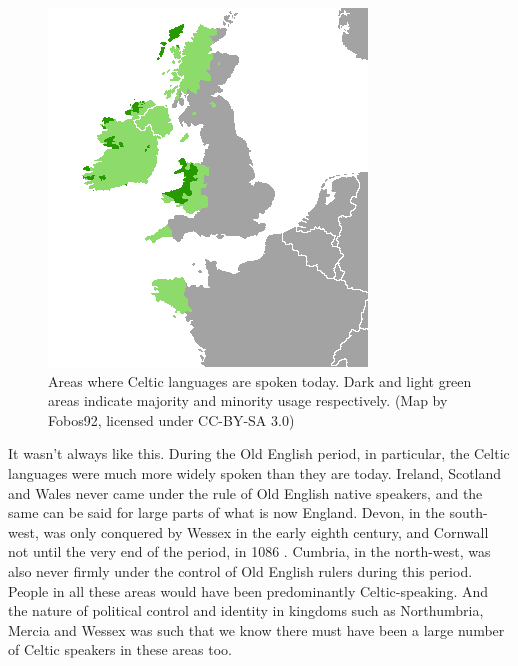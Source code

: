 \begin{figure}
    \centering
    \includegraphics[scale=0.6]{chapters/img/Lenguas_celtas.png}
    \caption{Areas where Celtic languages are spoken today. Dark and light green areas indicate majority and minority usage respectively. (Map by Fobos92, licensed under CC-BY-SA 3.0)}
    \label{fig:OE_Celtic}
\end{figure}

It wasn't always like this. During the Old English period, in particular, the Celtic languages were much more widely spoken than they are today. Ireland, Scotland and Wales never came under the rule of Old English native speakers, and the same can be said for large parts of what is now England. Devon, in the south-west, was only conquered by Wessex in the early eighth century, and Cornwall not until the very end of the period, in 1086 \citep{Wakelin1975}. Cumbria, in the north-west, was also never firmly under the control of Old English rulers during this period. People in all these areas would have been predominantly Celtic-speaking. And the nature of political control and identity in kingdoms such as Northumbria, Mercia and Wessex was such that we know there must have been a large number of Celtic speakers in these areas too.

